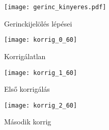 \begin{figure}[h]
	\texttt{[image: gerinc\_kinyeres.pdf]}
	\centering
	\caption{Gerinckijelölés lépései} \label{fig:gerinc_ki}
\end{figure}

\begin{figure}[!tbp]
	\centering
	\begin{minipage}[b]{0.3\textwidth}
		\texttt{[image: korrig\_0\_60]}
		\caption{Korrigálatlan}
	\end{minipage}
	\hfill
	\begin{minipage}[b]{0.3\textwidth}
		\texttt{[image: korrig\_1\_60]}
		\caption{Első korrigálás}
	\end{minipage}
	\hfill
	\begin{minipage}[b]{0.3\textwidth}
		\texttt{[image: korrig\_2\_60]}
		\caption{Második korrig}
	\end{minipage}
\end{figure}

